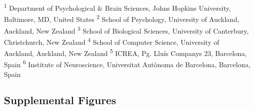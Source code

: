 \documentclass[
  man, donotrepeattitle,floatsintext]{apa6}
\begin{document}
\noindent \footnotesize \textsuperscript{1} Department of Psychological \& Brain Sciences, Johns Hopkins University, Baltimore, MD, United States \newline
\noindent \footnotesize \textsuperscript{2} School of Psychology, University of Auckland, Auckland, New Zealand \newline
\noindent \footnotesize \textsuperscript{3} School of Biological Sciences, University of Canterbury, Christchurch, New Zealand \newline
\noindent \footnotesize \textsuperscript{4} School of Computer Science, University of Auckland, Auckland, New Zealand \newline
\noindent \footnotesize \textsuperscript{5} ICREA, Pg. Lluís Companys 23, Barcelona, Spain \newline
\noindent \footnotesize \textsuperscript{6} Institute of Neuroscience, Universitat Autònoma de Barcelona, Barcelona, Spain \newline
\normalsize
\newpage

\hypertarget{supplemental-figures}{%
\subsection{Supplemental Figures}\label{supplemental-figures}}
\end{document}
